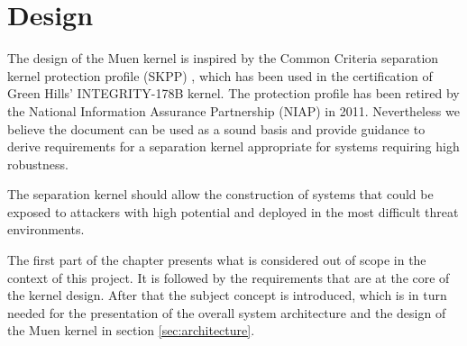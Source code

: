 \chapter{Design}\label{chap:design}
The design of the Muen kernel is inspired by the Common Criteria separation
kernel protection profile (SKPP) \cite{SKPP}, which has been used in the
certification of Green Hills' INTEGRITY-178B kernel. The protection profile has
been retired by the National Information Assurance Partnership (NIAP) in 2011.
Nevertheless we believe the document can be used as a sound basis and provide
guidance to derive requirements for a separation kernel appropriate for systems
requiring high robustness.

The separation kernel should allow the construction of systems that could be
exposed to attackers with high potential and deployed in the most difficult
threat environments.

The first part of the chapter presents what is considered out of scope in the
context of this project. It is followed by the requirements that are at the core
of the kernel design. After that the subject concept is introduced, which is in
turn needed for the presentation of the overall system architecture and the
design of the Muen kernel in section \ref{sec:architecture}.





